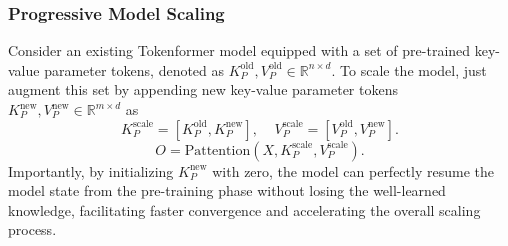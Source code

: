 \begin{frame}
\frametitle{Progressive Model Scaling}
Consider an existing Tokenformer model equipped with a
set of pre-trained key-value parameter tokens,
denoted as $K_P^{\text{old}}, V_P^{\text{old}} \in \mathbb{R}^{n \times d}$.
To scale the model, just augment this set by appending new key-value parameter
tokens $K_P^{\text{new}}, V_P^{\text{new}} \in \mathbb{R}^{m \times d}$ as
\begin{equation}
    K_P^{\text{scale}} = \left[K_P^{\text{old}}, K_P^{\text{new}}\right],
    ~~~~~V_P^{\text{scale}} = \left[V_P^{\text{old}}, V_P^{\text{new}}\right].
\end{equation}
\begin{equation}
    O = \text{Pattention}\left(X, K_P^{\text{scale}}, V_P^{\text{scale}}\right).
    \label{eq:token-parameter-3}
\end{equation}
Importantly, by initializing $K^{\text{new}}_P$ with zero,
the model can perfectly resume the model state from the pre-training
phase without losing the well-learned knowledge,
facilitating faster convergence and accelerating the overall scaling process.

\end{frame}
